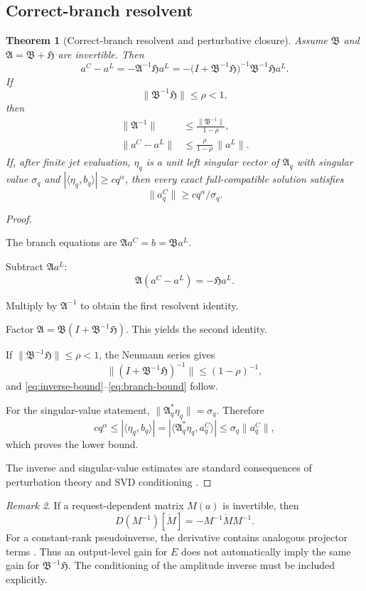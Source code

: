 \documentclass[12pt]{article}
\theoremstyle{plain}
\newtheorem{theorem}{Theorem}[section]
\theoremstyle{definition}
\theoremstyle{remark}
\newtheorem{remark}[theorem]{Remark}
\newcommand{\Comp}{\mathfrak A}
\newcommand{\Red}{\mathfrak B}
\newcommand{\Hidden}{\mathfrak H}
\begin{document}
\subsection{Correct-branch resolvent}
\begin{theorem}[Correct-branch resolvent and perturbative closure]\label{thm:resolvent}
Assume \(\Red\) and \(\Comp=\Red+\Hidden\) are invertible. Then
\[
\boxed{
a^C-a^L
=-\Comp^{-1}\Hidden a^L
=-\bigl(I+\Red^{-1}\Hidden\bigr)^{-1}\Red^{-1}\Hidden a^L.
}
\]
If
\[
\|\Red^{-1}\Hidden\|\le\rho<1,
\]
then
\begin{align}
\|\Comp^{-1}\|&\le \frac{\|\Red^{-1}\|}{1-\rho},\label{eq:inverse-bound}\\
\|a^C-a^L\|&\le \frac{\rho}{1-\rho}\,\|a^L\|.\label{eq:branch-bound}
\end{align}
If, after finite jet evaluation, \(\eta_q\) is a unit left singular vector of \(\Comp_q\) with singular value \(\sigma_q\) and \(|\langle\eta_q,b_q\rangle|\ge c q^\alpha\), then every exact full-compatible solution satisfies
\[
\|a^C_q\|\ge c q^\alpha/\sigma_q.
\]
\end{theorem}

\begin{proof}
\begin{prooflines}
\item The branch equations are \(\Comp a^C=b=\Red a^L\).
\item Subtract \(\Comp a^L\):
\[
\Comp(a^C-a^L)=-\Hidden a^L.
\]
\item Multiply by \(\Comp^{-1}\) to obtain the first resolvent identity.
\item Factor \(\Comp=\Red(I+\Red^{-1}\Hidden)\). This yields the second identity.
\item If \(\|\Red^{-1}\Hidden\|\le\rho<1\), the Neumann series gives
\[
\|(I+\Red^{-1}\Hidden)^{-1}\|\le(1-\rho)^{-1},
\]
and \eqref{eq:inverse-bound}--\eqref{eq:branch-bound} follow.
\item For the singular-value statement, \(\|\Comp_q^*\eta_q\|=\sigma_q\). Therefore
\[
cq^\alpha\le|\langle\eta_q,b_q\rangle|
=|\langle\Comp_q^*\eta_q,a_q^C\rangle|
\le\sigma_q\|a_q^C\|,
\]
which proves the lower bound.
\end{prooflines}
The inverse and singular-value estimates are standard consequences of perturbation theory and SVD conditioning \cite{StewartSun1990,Wedin1972,TrefethenBau1997}.
\end{proof}

\begin{remark}
If a request-dependent matrix \(M(a)\) is invertible, then
\[
D(M^{-1})[\dot M]=-M^{-1}\dot M M^{-1}.
\]
For a constant-rank pseudoinverse, the derivative contains analogous projector terms \cite{GolubPereyra1973}. Thus an output-level gain for \(E\) does not automatically imply the same gain for \(\Red^{-1}\Hidden\). The conditioning of the amplitude inverse must be included explicitly.
\end{remark}
\end{document}
